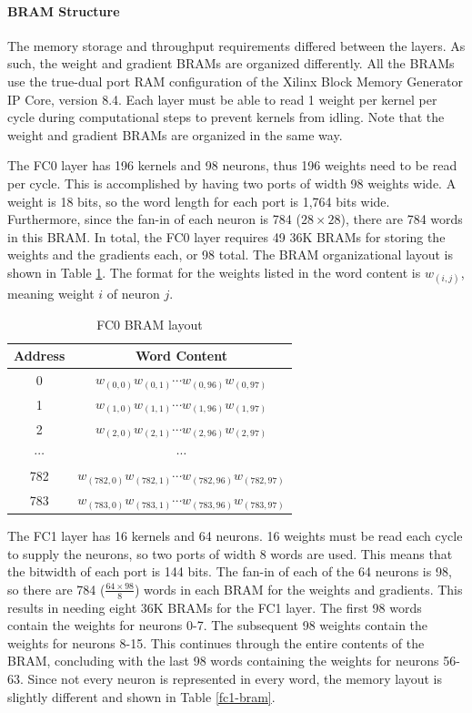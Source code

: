 \paragraph{BRAM Structure}
The memory storage and throughput requirements differed between the layers. As such, the weight and gradient BRAMs are organized differently. All the BRAMs use the true-dual port RAM configuration of the Xilinx Block Memory Generator IP Core, version 8.4. Each layer must be able to read 1 weight per kernel per cycle during computational steps to prevent kernels from idling. Note that the weight and gradient BRAMs are organized in the same way.

The FC0 layer has 196 kernels and 98 neurons, thus 196 weights need to be read per cycle.  This is accomplished by having two ports of width 98 weights wide. A weight is 18 bits, so the word length for each port is 1,764 bits wide. Furthermore, since the fan-in of each neuron is 784 ($28 \times 28$), there are 784 words in this BRAM. In total, the FC0 layer requires 49 36K BRAMs for storing the weights and the gradients each, or 98 total. The BRAM organizational layout is shown in Table \ref{fc0-bram}. The format for the weights listed in the word content is $w_{(i, j)}$,  meaning weight $i$ of neuron $j$.
\begin{table}
	\centering
	\begin{tabular}{|c|c|}
		\hline
		\textbf{Address} & \textbf{Word Content} \\\hline
		0 & $w_{(0, 0)}w_{(0, 1)}\cdots w_{(0, 96)}w_{(0, 97)}$\\
		1 & $w_{(1, 0)}w_{(1, 1)}\cdots w_{(1, 96)}w_{(1, 97)}$\\
		2 & $w_{(2, 0)}w_{(2, 1)}\cdots w_{(2, 96)}w_{(2, 97)}$\\
		$\cdots$ & $\cdots$ \\
		782 & $w_{(782, 0)}w_{(782, 1)}\cdots w_{(782, 96)}w_{(782, 97)}$\\
		783 & $w_{(783, 0)}w_{(783, 1)}\cdots w_{(783, 96)}w_{(783, 97)}$\\\hline
	\end{tabular}
	\caption{FC0 BRAM layout}	
	\label{fc0-bram}
\end{table}

The FC1 layer has 16 kernels and 64 neurons. 16 weights must be read each cycle to supply the neurons, so two ports of width 8 words are used. This means that the bitwidth of each port is 144 bits. The fan-in of each of the 64 neurons is 98, so there are 784 ($\frac{64\times98}{8}$) words in each BRAM for the weights and gradients. This results in needing eight 36K BRAMs for the FC1 layer. The first 98 words contain the weights for neurons 0-7. The subsequent 98 weights contain the weights for neurons 8-15. This continues through the entire contents of the BRAM, concluding with the last 98 words containing the weights for neurons 56-63. Since not every neuron is represented in every word, the memory layout is slightly different and shown in Table \ref{fc1-bram}.

